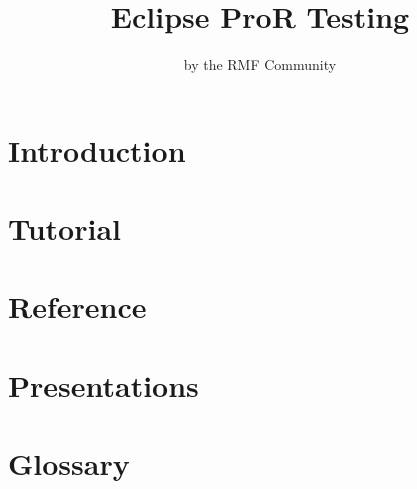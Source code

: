 \documentclass[twoside,10pt]{book}
\title{Eclipse ProR Testing}
\author{by the RMF Community}
\begin{document}
        

\maketitle

\tableofcontents

\chapter{Introduction}


\chapter{Tutorial}


\chapter{Reference}


\chapter{Presentations}


\chapter{Glossary}

\end{document}
